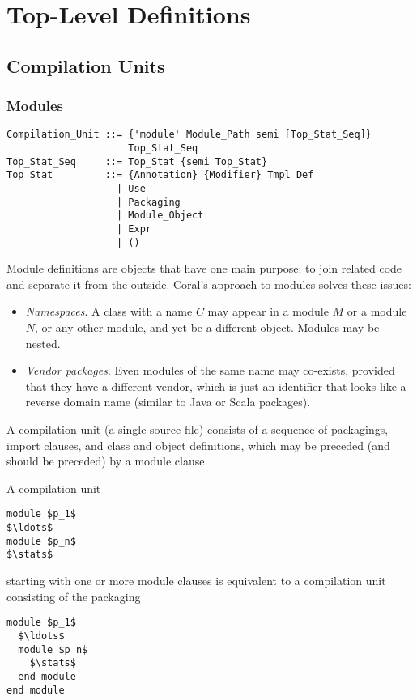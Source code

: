 
\chapter{Top-Level Definitions}

\section{Compilation Units}
\label{sec:compilation-units}

\subsection{Modules}
\label{sec:modules}

\syntax\begin{lstlisting}
Compilation_Unit ::= {'module' Module_Path semi [Top_Stat_Seq]} 
                     Top_Stat_Seq
Top_Stat_Seq     ::= Top_Stat {semi Top_Stat}
Top_Stat         ::= {Annotation} {Modifier} Tmpl_Def
                   | Use
                   | Packaging
                   | Module_Object
                   | Expr
                   | ()
\end{lstlisting}

Module definitions are objects that have one main purpose: to join related code and separate it from the outside. Coral's approach to modules solves these issues: 
\begin{itemize}
\item {\em Namespaces}. A class with a name $C$ may appear in a module $M$ or a module $N$, or any other module, and yet be a different object. Modules may be nested.
\item {\em Vendor packages}. Even modules of the same name may co-exists, provided that they have a different vendor, which is just an identifier that looks like a reverse domain name (similar to Java or Scala packages). 
\end{itemize}

A compilation unit (a single source file) consists of a sequence of packagings, import clauses, and class and object definitions, which may be preceded (and should be preceded) by a module clause. 

A compilation unit 
\begin{lstlisting}
module $p_1$
$\ldots$
module $p_n$
$\stats$
\end{lstlisting}
starting with one or more module clauses is equivalent to a compilation unit consisting of the packaging
\begin{lstlisting}
module $p_1$
  $\ldots$
  module $p_n$
    $\stats$
  end module
end module
\end{lstlisting}

